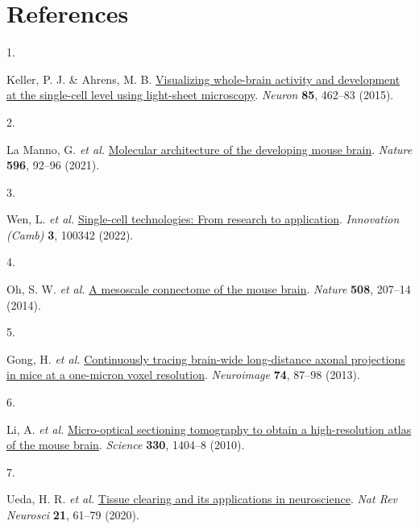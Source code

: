 \documentclass[
  12pt,
]{article}
\newlength{\cslhangindent}
\newlength{\csllabelwidth}
\newenvironment{CSLReferences}[2] %
 {\begin{list}{}{%
  \setlength{\itemindent}{0pt}
  \setlength{\leftmargin}{0pt}
  \setlength{\parsep}{0pt}
  \ifodd #1
   \setlength{\leftmargin}{\cslhangindent}
   \setlength{\itemindent}{-1\cslhangindent}
  \fi
  \setlength{\itemsep}{#2\baselineskip}}}
 {\end{list}}
\newcommand{\CSLLeftMargin}[1]{\parbox[t]{\csllabelwidth}{\strut#1\strut}}
\newcommand{\CSLRightInline}[1]{\parbox[t]{\linewidth - \csllabelwidth}{\strut#1\strut}}
\begin{document}
\clearpage

\section*{References}\label{references}

\label{refs}
\begin{CSLReferences}{0}{0}
\CSLLeftMargin{1. }%
\CSLRightInline{Keller, P. J. \& Ahrens, M. B.
\href{https://doi.org/10.1016/j.neuron.2014.12.039}{Visualizing
whole-brain activity and development at the single-cell level using
light-sheet microscopy}. \emph{Neuron} \textbf{85}, 462--83 (2015).}

\CSLLeftMargin{2. }%
\CSLRightInline{La Manno, G. \emph{et al.}
\href{https://doi.org/10.1038/s41586-021-03775-x}{Molecular architecture
of the developing mouse brain}. \emph{Nature} \textbf{596}, 92--96
(2021).}

\CSLLeftMargin{3. }%
\CSLRightInline{Wen, L. \emph{et al.}
\href{https://doi.org/10.1016/j.xinn.2022.100342}{Single-cell
technologies: From research to application}. \emph{Innovation (Camb)}
\textbf{3}, 100342 (2022).}

\CSLLeftMargin{4. }%
\CSLRightInline{Oh, S. W. \emph{et al.}
\href{https://doi.org/10.1038/nature13186}{A mesoscale connectome of the
mouse brain}. \emph{Nature} \textbf{508}, 207--14 (2014).}

\CSLLeftMargin{5. }%
\CSLRightInline{Gong, H. \emph{et al.}
\href{https://doi.org/10.1016/j.neuroimage.2013.02.005}{Continuously
tracing brain-wide long-distance axonal projections in mice at a
one-micron voxel resolution}. \emph{Neuroimage} \textbf{74}, 87--98
(2013).}

\CSLLeftMargin{6. }%
\CSLRightInline{Li, A. \emph{et al.}
\href{https://doi.org/10.1126/science.1191776}{Micro-optical sectioning
tomography to obtain a high-resolution atlas of the mouse brain}.
\emph{Science} \textbf{330}, 1404--8 (2010).}

\CSLLeftMargin{7. }%
\CSLRightInline{Ueda, H. R. \emph{et al.}
\href{https://doi.org/10.1038/s41583-019-0250-1}{Tissue clearing and its
applications in neuroscience}. \emph{Nat Rev Neurosci} \textbf{21},
61--79 (2020).}


\end{CSLReferences}
\end{document}
